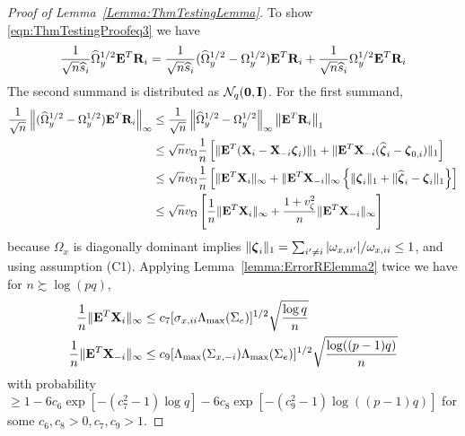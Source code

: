 \documentclass[12pt, letterpaper]{article}
\numberwithin{equation}{section}
\begin{document}
\begin{proof}[Proof of Lemma~\ref{Lemma:ThmTestingLemma}]
To show \eqref{eqn:ThmTestingProofeq3} we have
%
\begin{align*}
\frac{1}{\sqrt n \widehat s_i}  \widehat \Omega_y^{1/2} {\mathbf{E}}^T {\mathbf{R}}_i =
\frac{1}{\sqrt n \widehat s_i}  (\widehat \Omega_y^{1/2} - \Omega_y^{1/2}) {\mathbf{E}}^T {\mathbf{R}}_i +
\frac{1}{\sqrt n \widehat s_i}  \Omega_y^{1/2} {\mathbf{E}}^T {\mathbf{R}}_i
\end{align*}
%
The second summand is distributed as ${\cal{N}}_q ({\bf 0}, {\mathbf{I}})$. For the first summand,
%
\begin{align}\label{eqn:ThmTestingProofeq31}
\frac{1}{\sqrt n}  \left\| (\widehat \Omega_y^{1/2} - \Omega_y^{1/2}) {\mathbf{E}}^T {\mathbf{R}}_i \right\|_\infty & \leq
\frac{1}{\sqrt n}  \left\| \widehat \Omega_y^{1/2} - \Omega_y^{1/2} \right\|_\infty  \left\| {\mathbf{E}}^T {\mathbf{R}}_i \right\|_1  \notag\\
& \leq \sqrt n v_\Omega \frac{1}{n} \left[ \| {\mathbf{E}}^T ({\mathbf{X}}_i -  {\mathbf{X}}_{-i} {\boldsymbol{\zeta}}_i ) \|_1 + \| {\mathbf{E}}^T {\mathbf{X}}_{-i} (\widehat {{\boldsymbol{\zeta}}}_i - {\boldsymbol{\zeta}}_{0,i} ) \|_1 \right] \notag\\
& \leq \sqrt n v_\Omega \frac{1}{n} \left[ \| {\mathbf{E}}^T {\mathbf{X}}_i \|_\infty + \| {\mathbf{E}}^T {\mathbf{X}}_{-i} \|_\infty
\left\{ \| {\boldsymbol{\zeta}}_i  \|_1 + \| \widehat {{\boldsymbol{\zeta}}}_i - {\boldsymbol{\zeta}}_i  \|_1 \right\} \right] \notag\\
& \leq \sqrt n v_\Omega \left[ \frac{1}{n} \| {\mathbf{E}}^T {\mathbf{X}}_i \|_\infty + 
\frac{1 + v_\zeta^2}{n} \| {\mathbf{E}}^T {\mathbf{X}}_{-i} \|_\infty \right]
\end{align}
%
because $\Omega_x$ is diagonally dominant implies $\| {\boldsymbol{\zeta}}_i \|_1 = \sum_{i' \neq i} |\omega_{x,ii'}|/ \omega_{x,ii} \leq 1$, and using assumption (C1). Applying Lemma~\ref{lemma:ErrorRElemma2} twice we have for $n \succsim \log(pq)$,
%
\begin{align}
\frac{1}{n} \| {\mathbf{E}}^T {\mathbf{X}}_i \|_\infty & \leq 
c_7 [ \sigma_{x,ii} \Lambda_{\max} (\Sigma_e) ]^{1/2} \sqrt{\frac{ \log q}{n}}\label{eqn:ThmTestingProofeq32}\\
\frac{1}{n} \| {\mathbf{E}}^T {\mathbf{X}}_{-i} \|_\infty  & \leq 
c_9 [ \Lambda_{\max} (\Sigma_{x,-i}) \Lambda_{\max} (\Sigma_e) ]^{1/2} \sqrt{\frac{ \log((p-1)q)}{n}}\label{eqn:ThmTestingProofeq33}
\end{align}
%
with probability $\geq 1 - 6c_6 \exp [-(c_7^2-1) \log q] - 6c_8 \exp [-(c_9^2-1) \log((p-1)q)]$ for some $c_6, c_8 >0, c_7, c_9 > 1$.


\end{proof}
\end{document}
